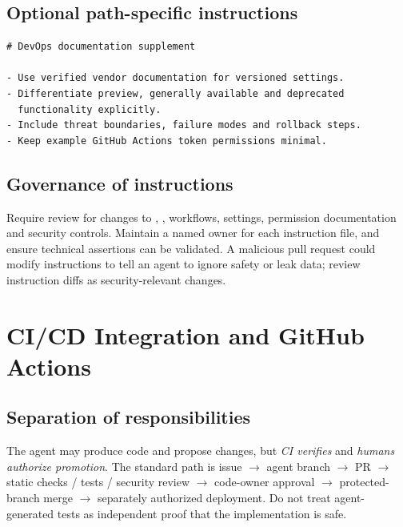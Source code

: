 \documentclass[11pt,letterpaper,oneside]{article}
\newcommand{\cmd}[1]{\path{#1}}
\begin{document}
\subsection{Optional path-specific instructions}
\begin{lstlisting}[style=mdstyle,caption={Example src/devops/AGENTS.md for more specific local instructions.}]
# DevOps documentation supplement

- Use verified vendor documentation for versioned settings.
- Differentiate preview, generally available and deprecated
  functionality explicitly.
- Include threat boundaries, failure modes and rollback steps.
- Keep example GitHub Actions token permissions minimal.
\end{lstlisting}

\subsection{Governance of instructions}
Require review for changes to \cmd{AGENTS.md}, \cmd{CODEOWNERS}, workflows, settings, permission documentation and security controls. Maintain a named owner for each instruction file, and ensure technical assertions can be validated. A malicious pull request could modify instructions to tell an agent to ignore safety or leak data; review instruction diffs as security-relevant changes.

\section{CI/CD Integration and GitHub Actions}
\subsection{Separation of responsibilities}
The agent may produce code and propose changes, but \emph{CI verifies} and \emph{humans authorize promotion}. The standard path is issue $\rightarrow$ agent branch $\rightarrow$ PR $\rightarrow$ static checks / tests / security review $\rightarrow$ code-owner approval $\rightarrow$ protected-branch merge $\rightarrow$ separately authorized deployment. Do not treat agent-generated tests as independent proof that the implementation is safe.
\end{document}
